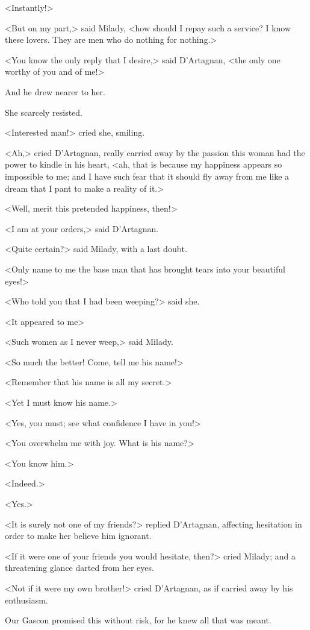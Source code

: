 <Instantly!> 

<But on my part,> said Milady, <how should I repay such a service? I know these lovers. They are men who do nothing for nothing.> 

<You know the only reply that I desire,> said D'Artagnan, <the only one worthy of you and of me!> 

And he drew nearer to her. 

She scarcely resisted. 

<Interested man!> cried she, smiling. 

<Ah,> cried D'Artagnan, really carried away by the passion this woman had the power to kindle in his heart, <ah, that is because my happiness appears so impossible to me; and I have such fear that it should fly away from me like a dream that I pant to make a reality of it.> 

<Well, merit this pretended happiness, then!> 

<I am at your orders,> said D'Artagnan. 

<Quite certain?> said Milady, with a last doubt. 

<Only name to me the base man that has brought tears into your beautiful eyes!> 

<Who told you that I had been weeping?> said she. 

<It appeared to me\longdash> 

<Such women as I never weep,> said Milady. 

<So much the better! Come, tell me his name!> 

<Remember that his name is all my secret.> 

<Yet I must know his name.> 

<Yes, you must; see what confidence I have in you!> 

<You overwhelm me with joy. What is his name?> 

<You know him.> 

<Indeed.> 

<Yes.> 

<It is surely not one of my friends?> replied D'Artagnan, affecting hesitation in order to make her believe him ignorant. 

<If it were one of your friends you would hesitate, then?> cried Milady; and a threatening glance darted from her eyes. 

<Not if it were my own brother!> cried D'Artagnan, as if carried away by his enthusiasm. 

Our Gascon promised this without risk, for he knew all that was meant. 

